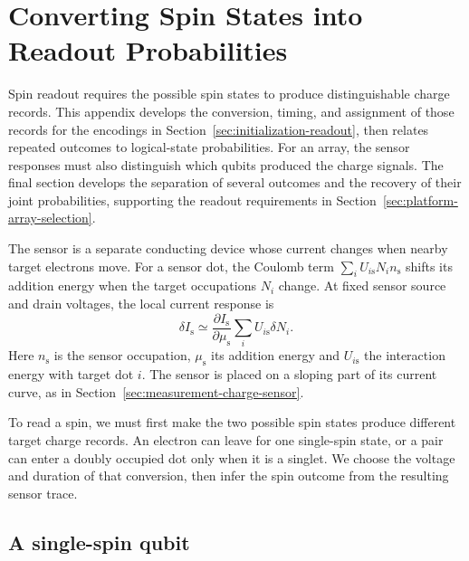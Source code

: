\FloatBarrier
\section{Converting Spin States into Readout Probabilities}
\label{app:spin-readout}
\label{sec:readout-calibration}

Spin readout requires the possible spin states to produce distinguishable
charge records. This appendix develops the conversion, timing, and
assignment of those records for the encodings in
Section~\ref{sec:initialization-readout}, then relates repeated outcomes
to logical-state probabilities. For an array, the sensor responses
must also distinguish which qubits produced the charge signals.
The final section develops the separation of several outcomes and
the recovery of their joint probabilities, supporting the readout
requirements in Section~\ref{sec:platform-array-selection}.

The sensor is a separate conducting device whose current changes
when nearby target electrons move. For a sensor dot, the Coulomb
term $\sum_i U_{i\mathrm s}N_i n_{\mathrm s}$ shifts its addition
energy when the target occupations $N_i$ change. At fixed sensor
source and drain voltages, the local current response is
\begin{equation}
 \delta I_{\mathrm s}\simeq
 \frac{\partial I_{\mathrm s}}{\partial\mu_{\mathrm s}}
             \sum_i U_{i\mathrm s}\delta N_i .
 \label{eq:calibration-sensor-charge-response}
\end{equation}
Here $n_{\mathrm s}$ is the sensor occupation, $\mu_{\mathrm s}$
its addition energy and $U_{i\mathrm s}$ the interaction energy
with target dot $i$. The sensor is placed on a sloping part of its
current curve, as in Section~\ref{sec:measurement-charge-sensor}.

To read a spin, we must first make the two possible spin states
produce different target charge records. An electron can leave
for one single-spin state, or a pair can enter a doubly occupied
dot only when it is a singlet. We choose the voltage and duration
of that conversion, then infer the spin outcome from the
resulting sensor trace.

\subsection{A single-spin qubit}
\label{sec:calibration-single-spin-readout}

